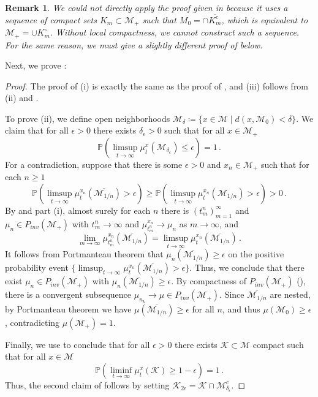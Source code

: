 \documentclass[final]{amsart}
\newtheorem{rem}[thm]{Remark}
\numberwithin{thm}{section}
\numberwithin{equation}{section}
\newcommand{\Prb}{\mathbb{P}}
\newcommand{\mcM}{\mathcal{M}}
\newcommand{\inv}{\mathcal{M}_+}
\newcommand{\K}{\mathcal{K}}
\begin{document}
\begin{rem}
We could not directly apply the proof given in \cite[Proposition 4.6ii]{persistence} because it uses a sequence of compact sets $K_m \subset \inv$ such that $M_0 = \cap \overline{K_m^c}$, which is equivalent to $\inv = \cup K_m^\circ$. Without local compactness, we cannot construct such a sequence. For the same reason, we must give a slightly different proof of \cite[Theorem 4.4ii]{persistence} below.
\end{rem}

Next, we prove :
\begin{proof}
    The proof of (i) is exactly the same as the proof of \cite[Theorem 4.4i]{persistence}, and (iii) follows from (ii) and .

    To prove (ii), we define open neighborhoods $\mcM_\delta \coloneqq \{x \in \mcM \mid d(x,\mcM_0) < \delta\}$. We claim  that for all $\epsilon > 0$ there exists $\delta_\epsilon > 0$ such that  for all $x \in \inv$
    $$\Prb(\limsup_{t \to \infty} \mu_t^x(\mcM_{\delta_\epsilon}) \leq \epsilon) = 1 \,.$$
For a contradiction, suppose that there is some $\epsilon > 0$ and $x_n \in \inv$ such that for each $n \geq 1$
$$\Prb(\limsup_{t \to \infty} \mu_t^{x_n}(\overline{\mcM_{1/n}}) > \epsilon) \geq \Prb(\limsup_{t \to \infty} \mu_t^{x_n}(\mcM_{1/n}) > \epsilon) > 0 \,.$$
By  and   part (i), almost surely for each $n$ there is $(t_m^n)_{m=1}^\infty$ and $\mu_n \in P_{inv}(\inv)$ with $t^n_m \to \infty$ and $\mu_{t_m^n}^{x_n} \to \mu_n$ as $m \to \infty$, and 
$$
\lim_{m \to \infty} \mu_{t_m^n}^{x_n}(\overline{\mcM_{1/n}}) =\limsup_{t \to \infty} \mu_t^{x_n}(\overline{\mcM_{1/n}}) \,.
$$ 
It follows from Portmanteau theorem that 
$\mu_n(\overline{\mcM_{1/n}}) \geq \epsilon$ on the positive probability event $\{\limsup_{t \to \infty} \mu_t^{x_n}(\overline{\mcM_{1/n}}) > \epsilon\}$. Thus, we conclude that there exist $\mu_n \in P_{inv}(\inv)$ with $\mu_n(\overline{\mcM_{1/n}}) \geq \epsilon$. By compactness of $P_{inv}(\inv)$ (), there is a convergent subsequence $\mu_{n_k} \to \mu \in P_{inv}(\inv)$. Since $\overline{\mcM_{1/n}}$ are nested, by Portmanteau theorem we have $\mu(\overline{\mcM_{1/n}}) \geq \epsilon$ for all $n$, and thus $\mu(\mcM_0) \geq \epsilon$, contradicting $\mu(\inv) = 1$.

Finally, we use 
 to conclude that for all $\epsilon > 0$ there exists $\K \subset \mcM$ compact such that  for all $x \in \mcM$
    $$\Prb(\liminf_{t \to \infty} \mu_t^x(\K) \geq 1 - \epsilon) = 1 \,.$$
Thus, the second claim of  follows by setting $\K_{2\epsilon} = \K \cap \mcM_{\delta_\epsilon}^c$.
 \end{proof}
\end{document}
